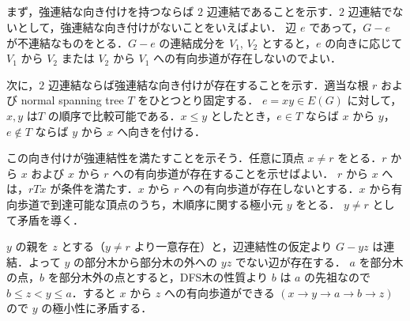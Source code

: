 \subsection{}
まず，強連結な向き付けを持つならば $2$ 辺連結であることを示す．$2$ 辺連結でないとして，強連結な向き付けがないことをいえばよい．
辺 $e$ であって，$G-e$ が不連結なものをとる．$G-e$ の連結成分を $V_1$, $V_2$ とすると，$e$ の向きに応じて $V_1$ から $V_2$ または $V_2$ から $V_1$ への有向歩道が存在しないのでよい．

次に，$2$ 辺連結ならば強連結な向き付けが存在することを示す．適当な根 $r$ および normal spanning tree $T$ をひとつとり固定する．
$e = xy \in E(G)$ に対して，$x,y$ は$T$ の順序で比較可能である．$x\leq y$ としたとき，$e\in T$ ならば $x$ から $y$，$e\notin T$ ならば $y$ から $x$ へ向きを付ける．

この向き付けが強連結性を満たすことを示そう．任意に頂点 $x\neq r$ をとる．$r$ から $x$ および $x$ から $r$ への有向歩道が存在することを示せばよい．
$r$ から $x$ へは，$rTx$ が条件を満たす．$x$ から $r$ への有向歩道が存在しないとする．$x$ から有向歩道で到達可能な頂点のうち，木順序に関する極小元 $y$ をとる．
$y\neq r$ として矛盾を導く．

$y$ の親を $z$ とする（$y\neq r$ より一意存在）と，辺連結性の仮定より $G-yz$ は連結．よって $y$ の部分木から部分木の外への $yz$ でない辺が存在する．
$a$ を部分木の点，$b$ を部分木外の点とすると，DFS木の性質より $b$ は $a$ の先祖なので $b \leq z < y \leq a$．すると $x$ から $z$ への有向歩道ができる $(x \to y\to a\to b\to z)$ ので $y$ の極小性に矛盾する．

